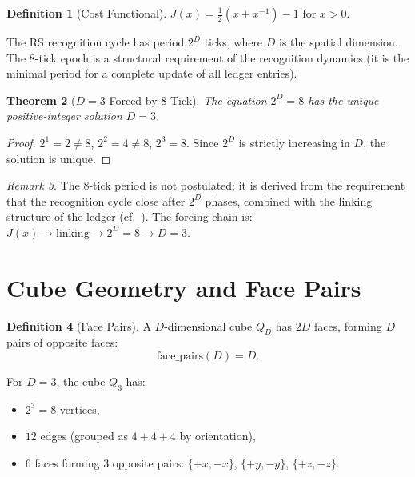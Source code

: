 \documentclass[12pt,a4paper]{article}
\newtheorem{theorem}{Theorem}[section]
\theoremstyle{definition}
\newtheorem{definition}[theorem]{Definition}
\theoremstyle{remark}
\newtheorem{remark}[theorem]{Remark}
\begin{document}
\begin{definition}[Cost Functional]
$J(x) = \tfrac{1}{2}(x + x^{-1}) - 1$ for $x > 0$.
\end{definition}

The RS recognition cycle has period $2^D$ ticks, where $D$ is the
spatial dimension.  The 8-tick epoch is a structural requirement
of the recognition dynamics (it is the minimal period for a complete
update of all ledger entries).

\begin{theorem}[$D = 3$ Forced by 8-Tick]
\label{thm:D3}
The equation $2^D = 8$ has the unique positive-integer solution $D = 3$.
\end{theorem}

\begin{proof}
$2^1 = 2 \neq 8$, $2^2 = 4 \neq 8$, $2^3 = 8$.  Since $2^D$ is
strictly increasing in $D$, the solution is unique.
\end{proof}

\begin{remark}
The 8-tick period is not postulated; it is derived from the
requirement that the recognition cycle close after $2^D$ phases,
combined with the linking structure of the ledger
(cf.~\cite{RS_Axioms}).  The forcing chain is:
$J(x) \to \text{linking} \to 2^D = 8 \to D = 3$.
\end{remark}

\section{Cube Geometry and Face Pairs}
\label{sec:cube}

\begin{definition}[Face Pairs]
\label{def:face-pairs}
A $D$-dimensional cube $Q_D$ has $2D$ faces, forming $D$ pairs of
opposite faces:
\begin{equation}
  \mathrm{face\_pairs}(D) = D.
\end{equation}
\end{definition}

For $D = 3$, the cube $Q_3$ has:
\begin{itemize}[nosep]
  \item $2^3 = 8$ vertices,
  \item $12$ edges (grouped as $4 + 4 + 4$ by orientation),
  \item $6$ faces forming $3$ opposite pairs: $\{+x, -x\}$,
  $\{+y, -y\}$, $\{+z, -z\}$.
\end{itemize}
\end{document}
